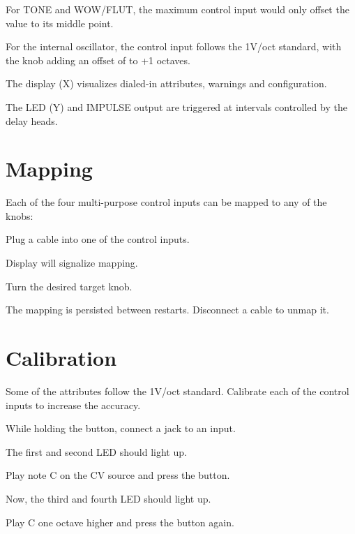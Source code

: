 \documentclass[11pt]{article}
\newenvironment{packed_enumerate}{
\begin{enumerate}
  \setlength{\itemsep}{1pt}
  \setlength{\parskip}{0pt}
  \setlength{\parsep}{0pt}
}{\end{enumerate}}
\begin{document}
\begin{minipage}[t]{0.45\textwidth}
For TONE and WOW/FLUT, the maximum control input would only offset the
value to its middle point.

For the internal oscillator, the control input follows the 1V/oct standard, with
the knob adding an offset of  to +1 octaves.

The display (X) visualizes dialed-in attributes, warnings and configuration.

The LED (Y) and IMPULSE output are triggered at intervals controlled by the
delay heads.

\end{minipage}%
\begin{minipage}{0.05\textwidth}
\phantom{ }
\end{minipage}%
\begin{minipage}[t]{0.45\textwidth}
\setlength{\parskip}{6pt}

\section{Mapping}

Each of the four multi-purpose control inputs can be mapped to any of the knobs:

\begin{packed_enumerate}
  \item Plug a cable into one of the control inputs.
  \item Display will signalize mapping.
  \item Turn the desired target knob.
\end{packed_enumerate}

The mapping is persisted between restarts. Disconnect a cable to unmap it.

\vspace{1.3cm}

\section{Calibration}

Some of the attributes follow the 1V/oct standard. Calibrate each of the control
inputs to increase the accuracy.

\begin{packed_enumerate}
  \item While holding the button, connect a jack to an input.
  \item The first and second LED should light up.
  \item Play note C on the CV source and press the button.
  \item Now, the third and fourth LED should light up.
  \item Play C one octave higher and press the button again.
\end{packed_enumerate}


\end{minipage}
\end{document}
